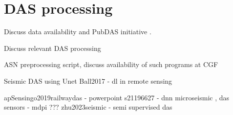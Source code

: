 \section{DAS processing}

Discuss data availability and PubDAS initiative \cite{spica2023pubdas}. 

Discuss relevant DAS processing 

ASN preprocessing script, discuss availability of such programs at CGF

Seismic DAS using Unet \cite{zhu2023seismic}
Ball2017 - dl in remote sensing

apSensingo2019railwaydas - powerpoint
s21196627 - dnn microseismic , das
sensors - mdpi ???
zhu2023seismic - semi supervised das